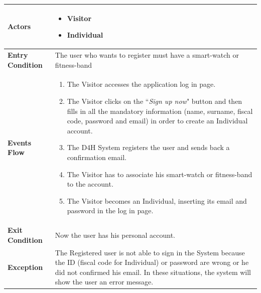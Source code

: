             \begin{table}[H]
            
            	\centering
                
                \begin{tabular}{|p{3cm}|p{8.2cm}|}
                    \hline
                    \textbf{Actors} & \begin{itemize}
                                          \item Visitor
                                          \item Individual
                                      \end{itemize} \\
                     \hline
                    \textbf{Entry Condition} & The user who wants to register must have a smart-watch or fitness-band\\
                     \hline
                    \textbf{Events Flow} & \begin{enumerate}
                                                \item The Visitor accesses the application log in page.
                                                \item The Visitor clicks on the ``\emph{Sign up now}" button and then fills in all the mandatory information (name, surname, fiscal code, password and email) in order to create an Individual account.
                                                \item The D4H System registers the user and sends back a confirmation email.
                                                \item The Visitor has to associate his smart-watch or fitness-band to the account.
                                                \item The Visitor becomes an Individual, inserting its email and password in the log in page.
                                            \end{enumerate}\\
                     \hline
                    \textbf{Exit Condition} & Now the user has his personal account.\\
                     \hline
                    \textbf{Exception} & The Registered user is not able to sign in the System because the ID (fiscal code for Individual) or password are wrong or he did not confirmed his email. In these situations, the system will show the user an error message.\\
                     \hline
                \end{tabular}  
            \end{table}
            
